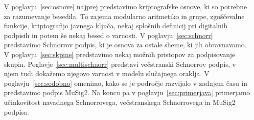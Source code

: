 V poglavju~\ref{sec:osnove} najprej predstavimo kriptografske osnove, ki so potrebne za razumevanje besedila.
To zajema modularno aritmetiko in grupe, zgoščevalne funkcije, kriptografijo javnega ključa, nekaj
splošnih definicij pri digitalnih podpisih in potem še nekaj besed o varnosti. V poglavju~\ref{sec:schnorr}
predstavimo Schnorrov podpis, ki je osnova za ostale sheme, ki jih obravnavamo. V 
poglavju~\ref{sec:skpine} predstavimo nekaj možnih pristopov za podpisovanje skupin. Poglavje~\ref{sec:multischnorr}
predstavi večstranski Schnorrov podpis, v njem tudi dokažemo njegovo varnost v modelu slučajnega oraklja.
V poglavju~\ref{sec:sodobno} omenimo, kako se je področje razvijalo v zadnjem času in predstavimo
podpis MuSig2. Na koncu pa v poglavju~\ref{sec:primerjava} primerjamo učinkovitost navadnega Schnorrovega,
večstranskega Schnorrovega in MuSig2 podpisa.
